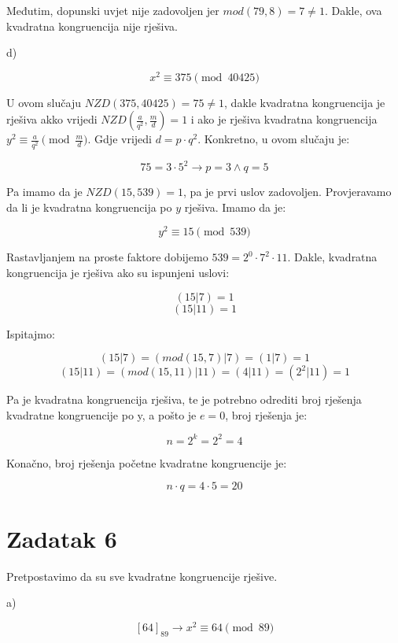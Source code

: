 \documentclass[12pt]{article}
\begin{document}
Međutim, dopunski uvjet nije zadovoljen jer $mod(79, 8) = 7 \neq 1$. Dakle, ova kvadratna kongruencija nije rješiva.

\newpage

d)

$$x^2 \equiv 375 \pmod{40425}$$\vspace{1mm}

U ovom slučaju $NZD(375, 40425) = 75 \neq 1$, dakle kvadratna kongruencija je rješiva akko vrijedi $NZD(\frac{a}{q^2}, \frac{m}{d}) = 1$ i ako je rješiva kvadratna kongruencija
$y^2 \equiv \frac{a}{q^2} \pmod{\frac{m}{d}}$. Gdje vrijedi $d = p \cdot q^2$. Konkretno, u ovom slučaju je:

$$75 = 3 \cdot 5^2 \to p = 3 \land q = 5$$\vspace{1mm}

Pa imamo da je $NZD(15, 539) = 1$, pa je prvi uslov zadovoljen. Provjeravamo da li je kvadratna kongruencija po $y$ rješiva. Imamo da je:

$$y^2 \equiv 15 \pmod{539}$$\vspace{1mm}

Rastavljanjem na proste faktore dobijemo $539 = 2^0 \cdot 7^2 \cdot 11$. Dakle, kvadratna kongruencija je rješiva ako su ispunjeni uslovi:

$$(15 | 7) = 1$$
$$(15 | 11) = 1$$

Ispitajmo:

$$(15 | 7) = (mod(15, 7) | 7) = (1 | 7) = 1$$
$$(15 | 11) = (mod(15, 11) | 11) = (4 | 11) = (2^2 | 11) = 1$$\vspace{1mm}

Pa je kvadratna kongruencija rješiva, te je potrebno odrediti broj rješenja kvadratne kongruencije po y, a pošto je $e = 0$, broj rješenja je:

$$n = 2^k = 2^2 = 4$$\vspace{1mm}

Konačno, broj rješenja početne kvadratne kongruencije je:

$$n \cdot q = 4 \cdot 5 = 20$$

\newpage

\section*{Zadatak 6\label{Z6} }

Pretpostavimo da su sve kvadratne kongruencije rješive.\vspace{1mm}

a)

$$[64]_{89} \to x^{2} \equiv 64 \pmod{89}$$\vspace{1mm}
\end{document}
